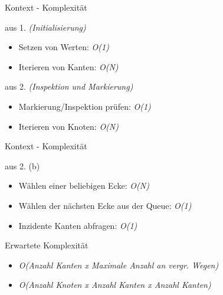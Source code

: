 \documentclass{beamer}
\begin{document}
    \begin{frame}{Kontext - Komplexit\"at}
        \begin{block}{aus 1. \textit{(Initialisierung)}}
            \begin{itemize}
                \item Setzen von Werten: \textit{O(1)}
                \item Iterieren von Kanten: \textit{O(N)}
            \end{itemize}
        \end{block}
        \begin{block}{aus 2. \textit{(Inspektion und Markierung)}}
            \begin{itemize}
                \item Markierung/Inspektion pr\"ufen: \textit{O(1)}
                \item Iterieren von Knoten: \textit{O(N)}
            \end{itemize}
        \end{block}
    \end{frame}

    \begin{frame}{Kontext - Komplexit\"at}
        \begin{block}{aus 2. (b)}
            \begin{itemize}
                \item W\"ahlen einer beliebigen Ecke: \textit{O(N)}
                \item W\"ahlen der n\"achsten Ecke aus der Queue: \textit{O(1)}
                \item Inzidente Kanten abfragen: \textit{O(1)}
            \end{itemize}
        \end{block}

        \begin{block}{Erwartete Komplexit\"at}
            \begin{itemize}
                \item \textit{O(Anzahl Kanten x Maximale Anzahl an vergr. Wegen)}
                \item \textit{O(Anzahl Knoten x Anzahl Kanten x Anzahl Kanten)}
            \end{itemize}
        \end{block}
    \end{frame}
\end{document}
